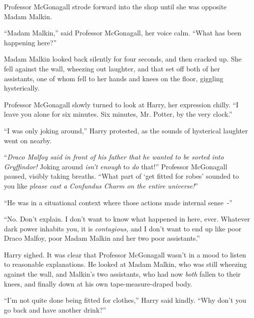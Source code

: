 Professor McGonagall strode forward into the shop until she was opposite Madam Malkin.

``Madam Malkin,'' said Professor McGonagall, her voice calm. ``What has been happening here?''

Madam Malkin looked back silently for four seconds, and then cracked up. She fell against the wall, wheezing out laughter, and that set off both of her assistants, one of whom fell to her hands and knees on the floor, giggling hysterically.

Professor McGonagall slowly turned to look at Harry, her expression chilly. ``I leave you alone for six minutes. Six minutes, Mr. Potter, by the very clock.''

``I was only joking around,'' Harry protested, as the sounds of hysterical laughter went on nearby.

``\emph{Draco Malfoy said in front of his father that he wanted to be sorted into Gryffindor!} Joking around \emph{isn't enough} to \emph{do} that!'' Professor McGonagall paused, visibly taking breaths. ``What part of `get fitted for robes' sounded to you like \emph{please cast a Confundus Charm on the entire universe!}''

``He was in a situational context where those actions made internal sense~-''

``No. Don't explain. I don't want to know what happened in here, ever. Whatever dark power inhabits you, it is \emph{contagious,} and I don't want to end up like poor Draco Malfoy, poor Madam Malkin and her two poor assistants.''

Harry sighed. It was clear that Professor McGonagall wasn't in a mood to listen to reasonable explanations. He looked at Madam Malkin, who was still wheezing against the wall, and Malkin's two assistants, who had now \emph{both} fallen to their knees, and finally down at his own tape-measure-draped body.

``I'm not quite done being fitted for clothes,'' Harry said kindly. ``Why don't you go back and have another drink?''
